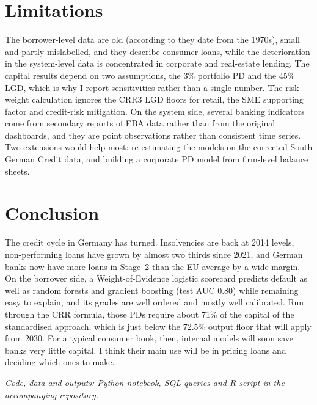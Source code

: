 \documentclass[11pt,a4paper]{article}
\begin{document}
\section{Limitations}
The borrower-level data are old (according to \citet{groemping2019} they date from the 1970s), small and partly mislabelled, and they describe consumer loans, while the deterioration in the system-level data is concentrated in corporate and real-estate lending. The capital results depend on two assumptions, the 3\% portfolio PD and the 45\% LGD, which is why I report sensitivities rather than a single number. The risk-weight calculation ignores the CRR3 LGD floors for retail, the SME supporting factor and credit-risk mitigation. On the system side, several banking indicators come from secondary reports of EBA data rather than from the original dashboards, and they are point observations rather than consistent time series. Two extensions would help most: re-estimating the models on the corrected South German Credit data, and building a corporate PD model from firm-level balance sheets.

\section{Conclusion}
The credit cycle in Germany has turned. Insolvencies are back at 2014 levels, non-performing loans have grown by almost two thirds since 2021, and German banks now have more loans in Stage~2 than the EU average by a wide margin. On the borrower side, a Weight-of-Evidence logistic scorecard predicts default as well as random forests and gradient boosting (test AUC 0.80) while remaining easy to explain, and its grades are well ordered and mostly well calibrated. Run through the CRR formula, those PDs require about 71\% of the capital of the standardised approach, which is just below the 72.5\% output floor that will apply from 2030. For a typical consumer book, then, internal models will soon save banks very little capital. I think their main use will be in pricing loans and deciding which ones to make.

\medskip
\textit{Code, data and outputs: Python notebook, SQL queries and R script in the accompanying repository.}
\end{document}
